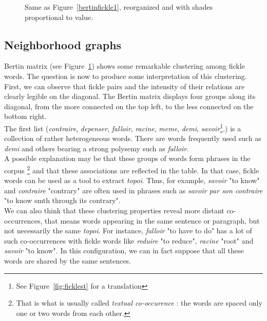 \documentclass[preprint]{elsarticle}
\begin{document}
\begin{figure}[h!]
{\begin{tabular}{|p{2pt}l|*{30}{c|}}
\end{tabular}
}
\caption{Same as Figure~\ref{bertinfickle1}, reorganized and with shades proportional to value.}
\label{bertin4}
\end{figure}

\subsection{Neighborhood graphs}

Bertin matrix (see Figure~\ref{bertin4}) shows some remarkable clustering among fickle words. The question is now to produce some interpretation of this clustering.\\

First, we can observe that fickle pairs and the intensity of their relations are clearly legible on the diagonal. The Bertin matrix displays four groups along its diagonal, from the more connected on the top left, to the less connected on the bottom right.\\

The first list (\textit{contraire}, \textit{depenser}, \textit{falloir}, \textit{racine}, \textit{meme}, \textit{demi}, \textit{savoir}\footnote{See Figure~\ref{fig:ficklest} for a translation}.) is a collection of rather heterogeneous words. There are words frequently used such as \textit{demi} and others bearing a strong polysemy such as \textit{falloir}.\\
 
A possible explanation may be that these groups of words form phrases in the corpus \footnote{That is what is usually called \textit{textual co-occurence} : the words are spaced only one or two words  from each other.} and that these associations are reflected in the table. In that case, fickle words can be used as a tool to extract \textit{topoi}. Thus, for example, \textit{savoir} "to know" and \textit{contraire} "contrary" are often used in phrases such as \textit{savoir par son contraire} "to know smth through its contrary".\\

We can also think that these clustering properties reveal more distant co-occurrences, that means words appearing in the same sentence or paragraph, but not necessarily the same \textit{topoi}. For instance, \textit{falloir} "to have to do" has a lot of such co-occurrences with fickle words like \textit{reduire} "to reduce", \textit{racine} "root" and \textit{savoir} "to know". In this configuration, we can in fact suppose that all these words are shared by the same sentences.\\
\end{document}
